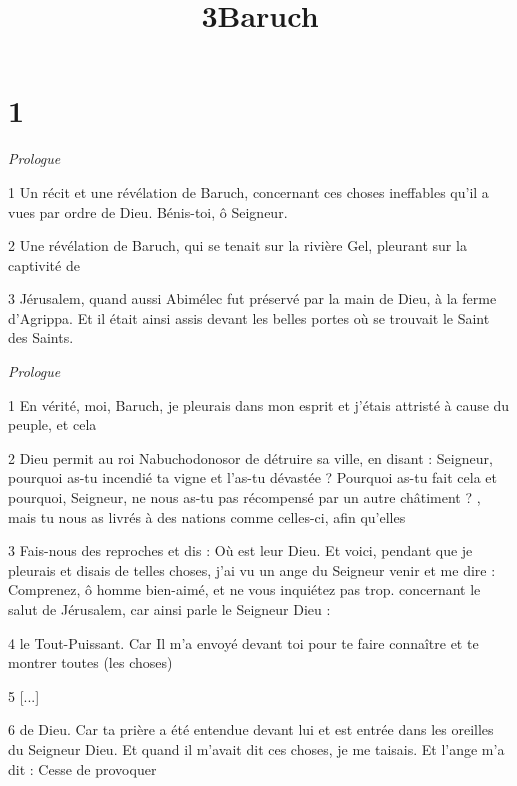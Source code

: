 

\title{3Baruch}

\chapter{1}

\par \textit{Prologue}

\par 1 Un récit et une révélation de Baruch, concernant ces choses ineffables qu'il a vues par ordre de Dieu. Bénis-toi, ô Seigneur.

\par 2 Une révélation de Baruch, qui se tenait sur la rivière Gel, pleurant sur la captivité de

\par 3 Jérusalem, quand aussi Abimélec fut préservé par la main de Dieu, à la ferme d'Agrippa. Et il était ainsi assis devant les belles portes où se trouvait le Saint des Saints.


\par \textit{Prologue}

\par 1 En vérité, moi, Baruch, je pleurais dans mon esprit et j'étais attristé à cause du peuple, et cela

\par 2 Dieu permit au roi Nabuchodonosor de détruire sa ville, en disant : Seigneur, pourquoi as-tu incendié ta vigne et l'as-tu dévastée ? Pourquoi as-tu fait cela et pourquoi, Seigneur, ne nous as-tu pas récompensé par un autre châtiment ? , mais tu nous as livrés à des nations comme celles-ci, afin qu'elles

\par 3 Fais-nous des reproches et dis : Où est leur Dieu. Et voici, pendant que je pleurais et disais de telles choses, j'ai vu un ange du Seigneur venir et me dire : Comprenez, ô homme bien-aimé, et ne vous inquiétez pas trop. concernant le salut de Jérusalem, car ainsi parle le Seigneur Dieu :

\par 4 le Tout-Puissant. Car Il m'a envoyé devant toi pour te faire connaître et te montrer toutes (les choses)

\par 5 [...]

\par 6 de Dieu. Car ta prière a été entendue devant lui et est entrée dans les oreilles du Seigneur Dieu. Et quand il m'avait dit ces choses, je me taisais. Et l'ange m'a dit : Cesse de provoquer

